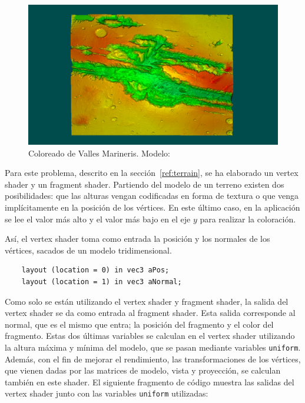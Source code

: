 \begin{figure}[h]
	\centering
	\includegraphics[width=\textwidth]{figures/myterrain.png}
	\caption[Coloreado de Valles Marineris.]{Coloreado de Valles Marineris.
	Modelo:~\cite{NASA}}
	\label{fig:myterrain}
\end{figure}

Para este problema, descrito en la sección~\ref{ref:terrain}, se ha elaborado un
vertex shader y un fragment shader. Partiendo del modelo de un terreno existen
dos posibilidades: que las alturas vengan codificadas en forma de textura o que
venga implícitamente en la posición de los vértices. En este último caso, en la
aplicación se lee el valor más alto y el valor más bajo en el eje $y$ para
realizar la coloración. 

Así, el vertex shader toma como entrada la posición y los normales de los
vértices, sacados de un modelo tridimensional.

\begin{verbatim}
    layout (location = 0) in vec3 aPos;
    layout (location = 1) in vec3 aNormal;
\end{verbatim}

Como solo se están utilizando el vertex shader y fragment shader, la salida del
vertex shader se da como entrada al fragment shader. Esta salida corresponde al
normal, que es el mismo que entra; la posición del fragmento y el color del
fragmento. Estas dos últimas variables se calculan en el vertex shader
utilizando la altura máxima y mínima del modelo, que se pasan mediante variables
\verb|uniform|.  Además, con el fin de mejorar el rendimiento, las
transformaciones de los vértices, que vienen dadas por las matrices de modelo,
vista y proyección, se calculan también en este shader. El siguiente fragmento
de código muestra las salidas del vertex shader junto con las variables
\verb|uniform| utilizadas:

